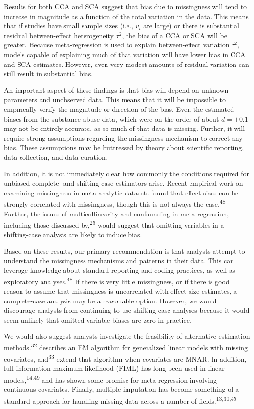 \documentclass[
]{article}
\begin{document}
Results for both CCA and SCA suggest that bias due to missingness will tend to increase in magnitude as a function of the total variation in the data.
This means that if studies have small sample sizes (i.e., \(v_i\) are large) or there is substantial residual between-effect heterogeneity \(\tau^2\), the bias of a CCA or SCA will be greater.
Because meta-regression is used to explain between-effect variation \(\tau^2\), models capable of explaining much of that variation will have lower bias in CCA and SCA estimates.
However, even very modest amounts of residual variation can still result in substantial bias.

An important aspect of these findings is that bias will depend on unknown parameters and unobserved data.
This means that it will be impossible to empirically verify the magnitude or direction of the bias.
Even the estimated biases from the substance abuse data, which were on the order of about \(d = \pm 0.1\) may not be entirely accurate, as so much of that data is missing.
Further, it will require strong assumptions regarding the missingness mechanism to correct any bias.
These assumptions may be buttressed by theory about scientific reporting, data collection, and data curation.

In addition, it is not immediately clear how commonly the conditions required for unbiased complete- and shifting-case estimators arise.
Recent empirical work on examining missingness in meta-analytic datasets found that effect sizes can be strongly correlated with missingness, though this is not always the case.\textsuperscript{48}
Further, the issues of multicollinearity and confounding in meta-regression, including those discussed by,\textsuperscript{25} would suggest that omitting variables in a shifting-case analysis are likely to induce bias.

Based on these results, our primary recommendation is that analysts attempt to understand the missingness mechanisms and patterns in their data.
This can leverage knowledge about standard reporting and coding practices, as well as exploratory analyses.\textsuperscript{48}
If there is very little missingness, or if there is good reason to assume that missingness is uncorrelated with effect size estimates, a complete-case analysis may be a reasonable option.
However, we would discourage analysts from continuing to use shifting-case analyses because it would seem unlikely that omitted variable biases are zero in practice.

We would also suggest analysts investigate the feasibility of alternative estimation methods.\textsuperscript{32} describes an EM algorithm for generalized linear models with missing covariates, and\textsuperscript{33} extend that algorithm when covariates are MNAR.
In addition, full-information maximum likelihood (FIML) has long been used in linear models,\textsuperscript{14,49} and has shown some promise for meta-regression involving continuous covariates.
Finally, multiple imputation has become something of a standard approach for handling missing data across a number of fields.\textsuperscript{13,30,45}
\end{document}
